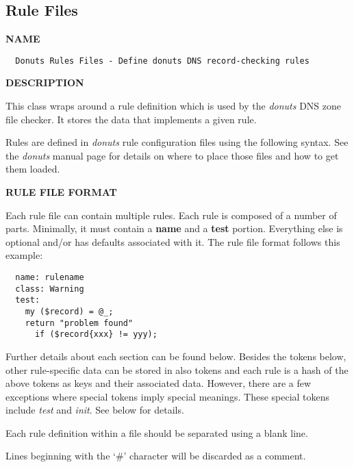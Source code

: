 \clearpage

\subsection{ Rule Files}

{\bf NAME}

\begin{verbatim}
  Donuts Rules Files - Define donuts DNS record-checking rules
\end{verbatim}

{\bf DESCRIPTION}

This class wraps around a rule definition which is used by the {\it donuts}
DNS zone file checker.  It stores the data that implements a given rule.

Rules are defined in {\it donuts} rule configuration files using the
following syntax.  See the {\it donuts} manual page for details on where to
place those files and how to get them loaded.

{\bf RULE FILE FORMAT}

Each rule file can contain multiple rules.  Each rule is composed of a
number of parts.  Minimally, it must contain a {\bf name} and a {\bf test}
portion.  Everything else is optional and/or has defaults associated
with it.  The rule file format follows this example:

\begin{verbatim}
  name: rulename
  class: Warning
  test:
    my ($record) = @_;
    return "problem found"
      if ($record{xxx} != yyy);
\end{verbatim}

Further details about each section can be found below.  Besides the
tokens below, other rule-specific data can be stored in also tokens
and each rule is a hash of the above tokens as keys and their
associated data.  However, there are a few exceptions where special
tokens imply special meanings.  These special tokens include {\it test}
and {\it init}.  See below for details.

Each rule definition within a file should be separated using a blank line.

Lines beginning with the `\#' character will be discarded as a comment.

